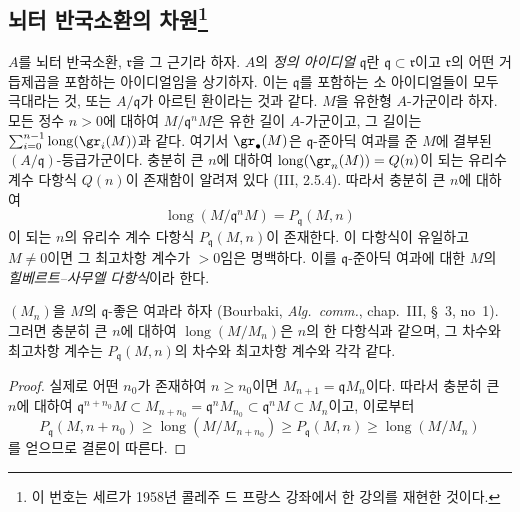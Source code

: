 \subsection[뇌터 반국소환의 차원]{뇌터 반국소환의
차원\protect\footnote{이 번호는 세르가 1958년 콜레주 드 프랑스
강좌에서 한 강의를 재현한 것이다.}}
\label{subsection:0.16.2-fr}

\begin{env}[16.2.1]
\label{0.16.2.1-fr}
$A$를 뇌터 반국소환, $\mathfrak{r}$을 그 근기라 하자. $A$의
\emph{정의 아이디얼} $\mathfrak{q}$란
$\mathfrak{q}\subset\mathfrak{r}$이고 $\mathfrak{r}$의 어떤
거듭제곱을 포함하는 아이디얼임을 상기하자. 이는 $\mathfrak{q}$를
포함하는 소 아이디얼들이 모두 극대라는 것, 또는
$A/\mathfrak{q}$가 아르틴 환이라는 것과 같다. $M$을 유한형
$A$-가군이라 하자. 모든 정수 $n>0$에 대하여
$M/\mathfrak{q}^nM$은 유한 길이 $A$-가군이고, 그 길이는
$\sum_{i=0}^{n-1}\operatorname{long}(\gr_i(M))$과 같다. 여기서
$\gr_\bullet(M)$은 $\mathfrak{q}$-준아딕 여과를 준 $M$에 결부된
$(A/\mathfrak{q})$-등급가군이다. 충분히 큰 $n$에 대하여
$\operatorname{long}(\gr_n(M))=Q(n)$이 되는 유리수 계수 다항식
$Q(n)$이 존재함이 알려져 있다 (III, 2.5.4). 따라서 충분히 큰
$n$에 대하여
\[
  \operatorname{long}(M/\mathfrak{q}^nM)=P_{\mathfrak{q}}(M,n)
\]
이 되는 $n$의 유리수 계수 다항식 $P_{\mathfrak{q}}(M,n)$이 존재한다.
이 다항식이 유일하고 $M\neq0$이면 그 최고차항 계수가 $>0$임은
명백하다. 이를 $\mathfrak{q}$-준아딕 여과에 대한 $M$의
\emph{힐베르트--사무엘 다항식}이라 한다.
\end{env}

\begin{lemma}[16.2.2.1]
\label{0.16.2.2.1-fr}
$(M_n)$을 $M$의 $\mathfrak{q}$-좋은 여과라 하자 (Bourbaki,
\emph{Alg.~comm.}, chap.~III, \S~3, no~1). 그러면 충분히 큰 $n$에
대하여 $\operatorname{long}(M/M_n)$은 $n$의 한 다항식과 같으며, 그
차수와 최고차항 계수는 $P_{\mathfrak{q}}(M,n)$의 차수와 최고차항
계수와 각각 같다.
\end{lemma}

\begin{proof}
실제로 어떤 $n_0$가 존재하여 $n\geq n_0$이면
$M_{n+1}=\mathfrak{q}M_n$이다. 따라서 충분히 큰 $n$에 대하여
$\mathfrak{q}^{n+n_0}M\subset M_{n+n_0}=\mathfrak{q}^nM_{n_0}
\subset\mathfrak{q}^nM\subset M_n$이고, 이로부터
\[
  P_{\mathfrak{q}}(M,n+n_0)\geq
  \operatorname{long}(M/M_{n+n_0})\geq
  P_{\mathfrak{q}}(M,n)\geq\operatorname{long}(M/M_n)
\]
를 얻으므로 결론이 따른다.
\end{proof}

